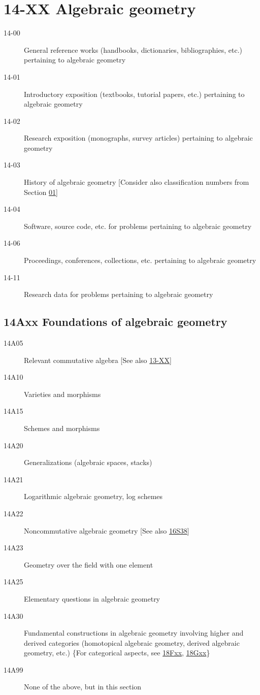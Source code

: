 \documentclass[letterpaper]{article}
\begin{document}
\section*{14-XX Algebraic geometry }\label{14-XX}
\begin{description}          
\item [14-00]\label{14-00} General reference works (handbooks, dictionaries, bibliographies, etc.) pertaining to algebraic geometry
\item [14-01]\label{14-01} Introductory exposition (textbooks, tutorial papers, etc.) pertaining to algebraic geometry
\item [14-02]\label{14-02} Research exposition (monographs, survey articles) pertaining to algebraic geometry
\item [14-03]\label{14-03} History of algebraic geometry [Consider also classification numbers from Section \hyperref[01-XX]{01}]
\item [14-04]\label{14-04} Software, source code, etc. for problems pertaining to algebraic geometry
\item [14-06]\label{14-06} Proceedings, conferences, collections, etc. pertaining to algebraic geometry
\item [14-11]\label{14-11} Research data for problems pertaining to algebraic geometry
\end{description}          
\subsection*{14Axx Foundations of algebraic geometry }\label{14Axx}
\begin{description}               
\item [14A05]\label{14A05} Relevant commutative algebra [See also \hyperref[13-XX]{13-XX}]
\item [14A10]\label{14A10} Varieties and morphisms
\item [14A15]\label{14A15} Schemes and morphisms
\item [14A20]\label{14A20} Generalizations (algebraic spaces, stacks)
\item [14A21]\label{14A21} Logarithmic algebraic geometry, log schemes
\item [14A22]\label{14A22} Noncommutative algebraic geometry [See also \hyperref[16S38]{16S38}]
\item [14A23]\label{14A23} Geometry over the field with one element
\item [14A25]\label{14A25} Elementary questions in algebraic geometry
\item [14A30]\label{14A30} Fundamental constructions in algebraic geometry involving higher and derived categories (homotopical algebraic geometry, derived algebraic geometry, etc.) \{For categorical aspects, see \hyperref[18Fxx]{18Fxx}, \hyperref[18Gxx]{18Gxx}\}
\item [14A99]\label{14A99} None of the above, but in this section
\end{description}          
\end{document}
